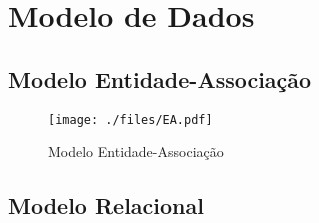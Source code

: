 %
%
\section{Modelo de Dados}\label{sec31}



\subsection{Modelo Entidade-Associação}\label{subsec311}

\begin{figure}[H]
	\hspace*{-2,5cm}
	\centering
	\texttt{[image: ./files/EA.pdf]}
	\caption{Modelo Entidade-Associação}
	\label{modelo-ea}
\end{figure}

\subsection{Modelo Relacional}\label{subsec312}

